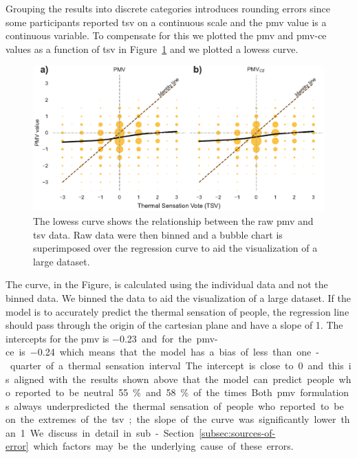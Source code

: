Grouping the results into discrete categories introduces rounding errors since some participants reported \ac{tsv} on a continuous scale and the \ac{pmv} value is a continuous variable.
To compensate for this we plotted the \ac{pmv} and \ac{pmv-ce} values as a function of \ac{tsv} in Figure~\ref{fig:bubble_models_vs_tsv} and we plotted a \ac{lowess} curve.

\begin{figure}[htb!]
    \centering
    \includegraphics[width=\textwidth]{figures/bubble_models_vs_tsv}
    \caption{The \ac{lowess} curve shows the relationship between the raw \ac{pmv} and \ac{tsv} data.
    Raw data were then binned and a bubble chart is superimposed over the regression curve to aid the visualization of a large dataset.}
    \label{fig:bubble_models_vs_tsv}
\end{figure}
The curve, in the Figure, is calculated using the individual data and not the binned data.
We binned the data to aid the visualization of a large dataset.
If the model is to accurately predict the thermal sensation of people, the regression line should pass through the origin of the cartesian plane and have a slope of 1.
The intercepts for the \ac{pmv} is \qty{-0.23} and for the \ac{pmv-ce} is \qty{-0.24} which means that the model has a bias of less than one-quarter of a thermal sensation interval. 
The intercept is close to 0 and this is aligned with the results shown above that the model can predict people who reported to be neutral \qty{55}{\percent} and \qty{58}{\percent} of the times.
Both \ac{pmv} formulations always underpredicted the thermal sensation of people who reported to be on the extremes of the \ac{tsv}; the slope of the curve was significantly lower than 1.
We discuss in detail in sub-Section~\ref{subsec:sources-of-error} which factors may be the underlying cause of these errors.

